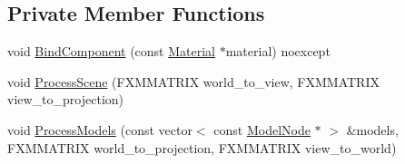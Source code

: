 \subsection*{Private Member Functions}
\begin{DoxyCompactItemize}
\item 
void \hyperlink{classmage_1_1_variable_component_pass_a4046b8c6773eab2b66af1caf7bbebb66}{Bind\+Component} (const \hyperlink{structmage_1_1_material}{Material} $\ast$material) noexcept
\item 
void \hyperlink{classmage_1_1_variable_component_pass_af5b0d4b24912744a7d68111d8b9598ad}{Process\+Scene} (F\+X\+M\+M\+A\+T\+R\+IX world\+\_\+to\+\_\+view, F\+X\+M\+M\+A\+T\+R\+IX view\+\_\+to\+\_\+projection)
\item 
void \hyperlink{classmage_1_1_variable_component_pass_ac6aac234da2c7310f036e6a7e4df0afa}{Process\+Models} (const vector$<$ const \hyperlink{classmage_1_1_model_node}{Model\+Node} $\ast$ $>$ \&models, F\+X\+M\+M\+A\+T\+R\+IX world\+\_\+to\+\_\+projection, F\+X\+M\+M\+A\+T\+R\+IX view\+\_\+to\+\_\+world)
\end{DoxyCompactItemize}
